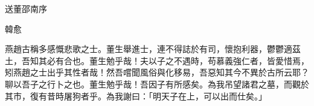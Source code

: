 送董邵南序

韓愈

燕趙古稱多感慨悲歌之士。董生舉進士，連不得誌於有司，懷抱利器，鬱鬱適茲土，吾知其必有合也。董生勉乎哉！夫以子之不遇時，苟慕義強仁者，皆愛惜焉，矧燕趙之士出乎其性者哉！然吾嚐聞風俗與化移易，吾惡知其今不異於古所云耶？聊以吾子之行卜之也。董生勉乎哉！吾因子有所感矣。為我吊望諸君之墓，而觀於其市，復有昔時屠狗者乎。為我謝曰：「明天子在上，可以出而仕矣。」